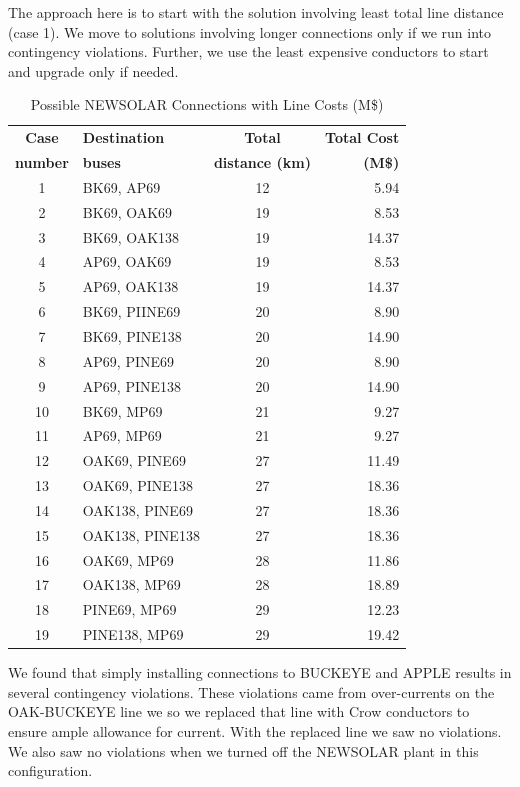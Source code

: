 \documentclass[conference]{IEEEtran}
\begin{document}
The approach here is to start with the solution involving least total line distance (case 1). We move to solutions involving longer connections only if we run into contingency violations. Further, we use the least expensive conductors to start and upgrade only if needed. 
\begin{table}[h]
	\centering
	\begin{tabular}{|c|l|c|r|}
		\hline
		\textbf{Case} & \textbf{Destination} & \textbf{Total} & \textbf{Total Cost} \\
		\textbf{number} & \textbf{buses} & \textbf{distance (km)} & \textbf{(M\$)} \\
		\hline
		1 & BK69, AP69 & 12 & 5.94 \\
		2 & BK69, OAK69 & 19 & 8.53 \\
		3 & BK69, OAK138 & 19 & 14.37 \\
		4 & AP69, OAK69 & 19 & 8.53 \\
		5 & AP69, OAK138 & 19 & 14.37 \\
		6 & BK69, PIINE69 & 20 & 8.90 \\
		7 & BK69, PINE138 & 20 & 14.90 \\
		8 & AP69, PINE69 & 20 & 8.90 \\
		9 & AP69, PINE138 & 20 & 14.90 \\
		10 & BK69, MP69 & 21 & 9.27 \\
		11 & AP69, MP69 & 21 & 9.27 \\
		12 & OAK69, PINE69 & 27 & 11.49 \\
		13 & OAK69, PINE138 & 27 & 18.36 \\
		14 & OAK138, PINE69 & 27 & 18.36 \\
		15 & OAK138, PINE138 & 27 & 18.36 \\
		16 & OAK69, MP69 & 28 & 11.86 \\
		17 & OAK138, MP69 & 28 & 18.89 \\
		18 & PINE69, MP69 & 29 & 12.23 \\
		19 & PINE138, MP69 & 29 & 19.42 \\
		\hline
	\end{tabular}
	\vspace{0.5em}
	\caption{Possible NEWSOLAR Connections with Line Costs (M\$)}
	\label{tab:all_conn}
\end{table}

We found that simply installing connections to BUCKEYE and APPLE results in several contingency violations. These violations came from over-currents on the OAK-BUCKEYE line we so we replaced that line with Crow conductors to ensure ample allowance for current. With the replaced line we saw no violations. We also saw no violations when we turned off the NEWSOLAR plant in this configuration. 
\end{document}

